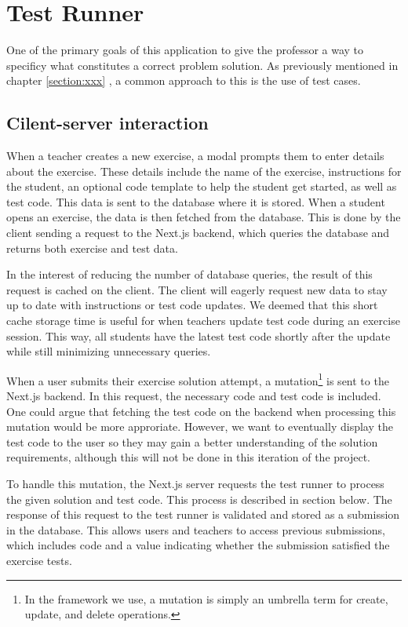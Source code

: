 \chapter{Test Runner} \label{chap:TestRunner}
One of the primary goals of this application to give the professor a way to specificy what constitutes a correct problem solution.
As previously mentioned in chapter \ref{section:xxx} , a common approach to this is the use of test cases.

\section{Cilent-server interaction}
When a teacher creates a new exercise, a modal prompts them to enter details about the exercise.
These details include the name of the exercise, instructions for the student, an optional code template to help the student get started, as well as test code.
This data is sent to the database where it is stored.
When a student opens an exercise, the data is then fetched from the database.
This is done by the client sending a request to the Next.js backend, which queries the database and returns both exercise and test data.

In the interest of reducing the number of database queries, the result of this request is cached on the client. 
The client will eagerly request new data to stay up to date with instructions or test code updates.
We deemed that this short cache storage time is useful for when teachers update test code during an exercise session.
This way, all students have the latest test code shortly after the update while still minimizing unnecessary queries.

When a user submits their exercise solution attempt, a mutation\footnote{In the framework we use, a mutation is simply an umbrella term for create, update, and delete operations.} is sent to the Next.js backend.
In this request, the necessary code and test code is included. 
One could argue that fetching the test code on the backend when processing this mutation would be more approriate.
However, we want to eventually display the test code to the user so they may gain a better understanding of the solution requirements, although this will not be done in this iteration of the project.

To handle this mutation, the Next.js server requests the test runner to process the given solution and test code.
This process is described in section \label{sec:test_runner_process} below. 
The response of this request to the test runner is validated and stored as a submission in the database. 
This allows users and teachers to access previous submissions, which includes code and a value indicating whether the submission satisfied the exercise tests.

